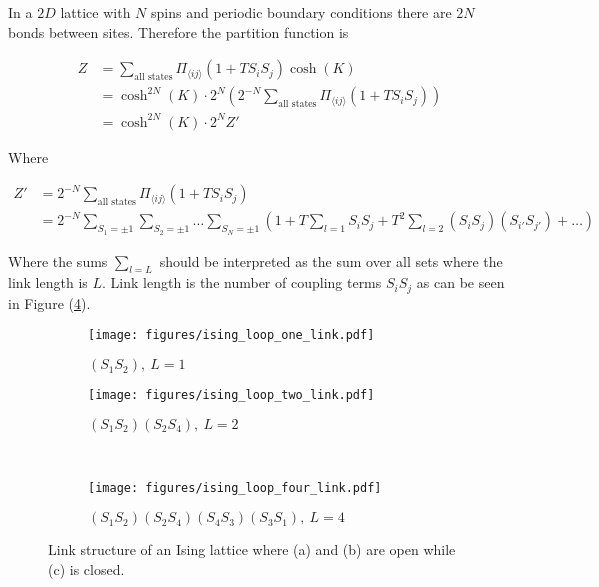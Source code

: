 In a $2D$ lattice with $N$ spins and periodic boundary conditions there are $2N$ bonds between sites. Therefore the partition function is

\begin{align*}
    Z &= \sum_{\text{all states}} \Pi_{\langle ij \rangle} (1 + T S_i S_j) \cosh(K) \\
    &= \cosh^{2N} (K) \cdot 2^N \left ( 2^{-N} \sum_{\text{all states}} \Pi_{\langle ij \rangle} (1 + T S_i S_j) \right ) \\
    &= \cosh^{2N} (K) \cdot 2^N Z'
\end{align*}

Where

\begin{align*}
    Z' &= 2^{-N} \sum_{\text{all states}} \Pi_{\langle ij \rangle} (1 + T S_i S_j) \\
    &= 2^{-N} \sum_{S_1 = \pm 1} \sum_{S_2 = \pm 1} \ldots \sum_{S_N = \pm 1} \left ( 1 + T \sum_{l = 1} S_i S_j + T^2 \sum_{l = 2} (S_i S_j)(S_{i'} S_{j'}) + \ldots \right ) 
\end{align*}

Where the sums $\sum_{l=L}$ should be interpreted as the sum over all sets where the link length is $L$. Link length is the number of coupling terms $S_i S_j$ as can be seen in Figure (\ref{fig:LinkIsing}).

\begin{figure}[h!]
    \begin{subfigure}{.5\linewidth}
        \centering
        \texttt{[image: figures/ising\_loop\_one\_link.pdf]}
        \caption{$(S_1 S_2), \ L = 1$}
        \label{fig:oneLinkIsing}
    \end{subfigure}%
    \begin{subfigure}{.5\linewidth}
        \centering
        \texttt{[image: figures/ising\_loop\_two\_link.pdf]}
        \caption{$(S_1 S_2)(S_2 S_4), \ L = 2$}
        \label{fig:twoLinkIsing}
    \end{subfigure}\\[1ex]
    \begin{subfigure}{\linewidth}
        \centering
        \texttt{[image: figures/ising\_loop\_four\_link.pdf]}
        \caption{$(S_1 S_2)(S_2 S_4)(S_4 S_3)(S_3 S_1), \ L = 4$}
    \label{fig:fourLinkIsing}
    \end{subfigure}
    \caption{Link structure of an Ising lattice where (a) and (b) are open while (c) is closed.}
    \label{fig:LinkIsing}
\end{figure}

